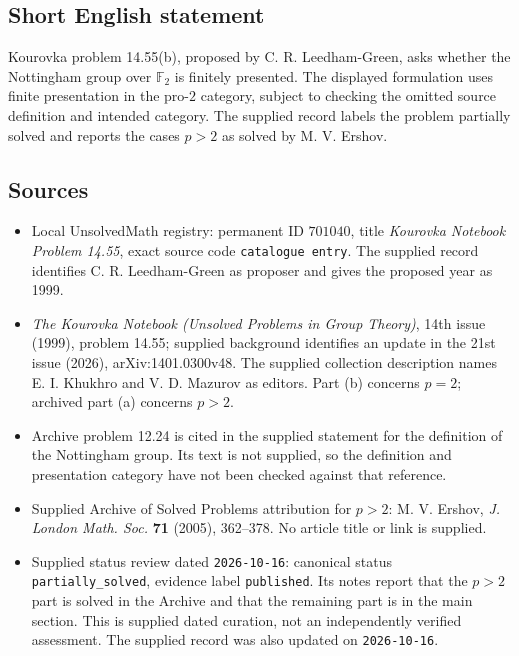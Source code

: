 \documentclass[11pt]{article}
\newcommand{\F}{\mathbb{F}}
\begin{document}
\subsection{Short English statement}
Kourovka problem 14.55(b), proposed by C. R. Leedham-Green, asks whether the Nottingham group over \(\F_2\) is finitely presented. The displayed formulation uses finite presentation in the pro-\(2\) category, subject to checking the omitted source definition and intended category. The supplied record labels the problem partially solved and reports the cases \(p>2\) as solved by M. V. Ershov.
\subsection{Sources}
\begin{itemize}
\item Local UnsolvedMath registry: permanent ID \(701040\), title \emph{Kourovka Notebook Problem 14.55}, exact source code \texttt{catalogue entry}. The supplied record identifies C. R. Leedham-Green as proposer and gives the proposed year as 1999.
\item \emph{The Kourovka Notebook (Unsolved Problems in Group Theory)}, 14th issue (1999), problem 14.55; supplied background identifies an update in the 21st issue (2026), arXiv:1401.0300v48. The supplied collection description names E. I. Khukhro and V. D. Mazurov as editors. Part (b) concerns \(p=2\); archived part (a) concerns \(p>2\).
\item Archive problem 12.24 is cited in the supplied statement for the definition of the Nottingham group. Its text is not supplied, so the definition and presentation category have not been checked against that reference.
\item Supplied Archive of Solved Problems attribution for \(p>2\): M. V. Ershov, \emph{J. London Math. Soc.} \textbf{71} (2005), 362--378. No article title or link is supplied.
\item Supplied status review dated \texttt{2026-10-16}: canonical status \texttt{partially\_solved}, evidence label \texttt{published}. Its notes report that the \(p>2\) part is solved in the Archive and that the remaining part is in the main section. This is supplied dated curation, not an independently verified assessment. The supplied record was also updated on \texttt{2026-10-16}.
\end{itemize}
\end{document}
